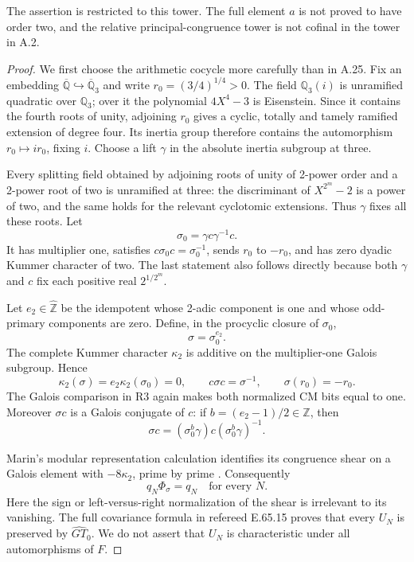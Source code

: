 The assertion is restricted to this tower. The full
element \(a\) is not proved to have order two, and the
relative principal-congruence tower is not cofinal in
the tower in A.2.

\begin{proof}
We first choose the arithmetic cocycle more carefully
than in A.25. Fix an embedding
\(\overline{\mathbb Q}\hookrightarrow\overline{\mathbb Q}_3\)
and write \(r_0=(3/4)^{1/4}>0\). The field
\(\mathbb Q_3(i)\) is unramified quadratic over
\(\mathbb Q_3\); over it the polynomial
\(4X^4-3\) is Eisenstein. Since it contains the fourth
roots of unity, adjoining \(r_0\) gives a cyclic,
totally and tamely ramified extension of degree four.
Its inertia group therefore contains the automorphism
\(r_0\mapsto ir_0\), fixing \(i\). Choose a lift
\(\gamma\) in the absolute inertia subgroup at three.

Every splitting field obtained by adjoining roots of
unity of 2-power order and a 2-power root of two is
unramified at three: the discriminant of
\(X^{2^m}-2\) is a power of two, and the same holds
for the relevant cyclotomic extensions. Thus
\(\gamma\) fixes all these roots. Let
\[
 \sigma_0=\gamma c\gamma^{-1}c.
\]
It has multiplier one, satisfies
\(c\sigma_0c=\sigma_0^{-1}\), sends \(r_0\) to
\(-r_0\), and has zero dyadic Kummer character of two.
The last statement also follows directly because both
\(\gamma\) and \(c\) fix each positive real
\(2^{1/2^m}\).

Let \(e_2\in\widehat{\mathbb Z}\) be the idempotent
whose 2-adic component is one and whose odd-primary
components are zero. Define, in the procyclic closure
of \(\sigma_0\),
\[
                         \sigma=\sigma_0^{e_2}.
\]
The complete Kummer character \(\kappa_2\) is additive
on the multiplier-one Galois subgroup. Hence
\[
 \kappa_2(\sigma)=e_2\kappa_2(\sigma_0)=0,
 \qquad c\sigma c=\sigma^{-1},
 \qquad \sigma(r_0)=-r_0.
 \tag{A.31.2}
\]
The Galois comparison in R3 again makes both normalized
CM bits equal to one. Moreover \(\sigma c\) is a
Galois conjugate of \(c\): if
\(b=(e_2-1)/2\in\widehat{\mathbb Z}\), then
\[
 \sigma c=(\sigma_0^b\gamma)c(\sigma_0^b\gamma)^{-1}.
\]

Marin's modular representation calculation identifies
its congruence shear on a Galois element with
\(-8\kappa_2\), prime by prime
\cite[\S4, p.~776]{AMarin2008}.
Consequently
\[
                         q_N\Phi_\sigma=q_N
                         \quad\text{for every }N.
 \tag{A.31.3}
\]
Here the sign or left-versus-right normalization of
the shear is irrelevant to its vanishing. The full
covariance formula in refereed E.65.15 proves that
every \(U_N\) is preserved by
\(\widehat{GT}_0\). We do not assert that \(U_N\)
is characteristic under all automorphisms of \(F\).


\end{proof}
